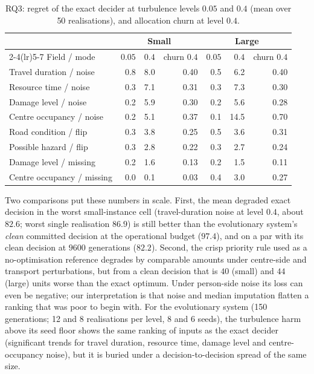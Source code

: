 \documentclass[systems,article,submit,moreauthors,pdftex]{Definitions/mdpi}
\begin{document}
\begin{table}[H]
\centering
\caption{RQ3: regret of the exact decider at turbulence levels $0.05$ and $0.4$ (mean over 50
realisations), and allocation churn at level $0.4$.\label{tab:rq3}}
\small
\begin{tabular}{lrrrrrr}
\toprule
& \multicolumn{3}{c}{Small} & \multicolumn{3}{c}{Large}\\
\cmidrule(lr){2-4}\cmidrule(lr){5-7}
Field / mode & $0.05$ & $0.4$ & churn $0.4$ & $0.05$ & $0.4$ & churn $0.4$\\
\midrule
Travel duration / noise & 0.8 & 8.0 & 0.40 & 0.5 & 6.2 & 0.40\\
Resource time / noise & 0.3 & 7.1 & 0.31 & 0.3 & 7.3 & 0.30\\
Damage level / noise & 0.2 & 5.9 & 0.30 & 0.2 & 5.6 & 0.28\\
Centre occupancy / noise & 0.2 & 5.1 & 0.37 & 0.1 & 14.5 & 0.70\\
Road condition / flip & 0.3 & 3.8 & 0.25 & 0.5 & 3.6 & 0.31\\
Possible hazard / flip & 0.3 & 2.8 & 0.22 & 0.3 & 2.7 & 0.24\\
Damage level / missing & 0.2 & 1.6 & 0.13 & 0.2 & 1.5 & 0.11\\
Centre occupancy / missing & 0.0 & 0.1 & 0.03 & 0.4 & 3.0 & 0.27\\
\bottomrule
\end{tabular}
\end{table}

Two comparisons put these numbers in scale. First, the mean degraded exact decision in the worst small-instance cell
(travel-duration noise at level $0.4$, about $82.6$; worst single realisation $86.9$) is still
better than the
evolutionary system's \emph{clean} committed decision at the operational budget ($97.4$),
and on a par with its clean decision at $9600$ generations ($82.2$). Second, the crisp
priority rule used as a no-optimisation reference degrades by comparable amounts under
centre-side and transport perturbations, but from a clean decision that is $40$ (small) and
$44$ (large) units worse than the exact optimum. Under person-side noise its loss can even be
negative; our interpretation is that noise and median imputation flatten a ranking that was
poor to begin with. For the evolutionary system (150 generations; 12 and 8 realisations per level, 8 and 6
seeds), the turbulence harm above its seed floor shows the same
ranking of inputs as the exact decider (significant trends for travel duration, resource
time, damage level and centre-occupancy noise), but it is buried under a decision-to-decision
spread of the same size.
\end{document}
